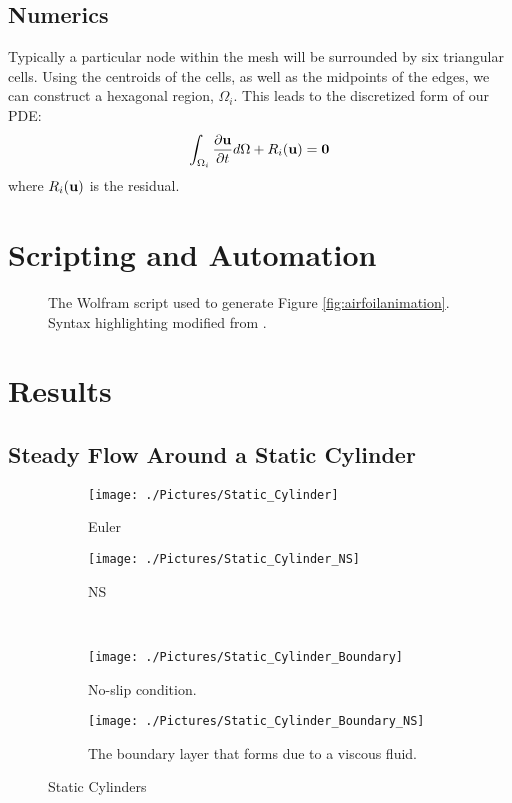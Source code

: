 \documentclass[10pt, titlepage]{article}
\begin{document}
\subsection{Numerics}

Typically a particular node within the mesh will be surrounded by six triangular cells. Using the centroids of the cells, as well as the midpoints of the edges, we can construct a hexagonal region, $\Omega_i$. This leads to the discretized form of our PDE:
\begin{equation*}
\int_{\Omega_i} \frac{\partial \bf{u}}{\partial t} d\Omega + R_i(\bf{u}) = 0
\end{equation*}
where $R_i(\bf{u})$ is the residual.

\section{Scripting and Automation}
\lipsum[1-2]

\begin{figure}[p]

\caption[Automated Wolfram Script]{The Wolfram script used to generate Figure \ref{fig:airfoilanimation}. Syntax highlighting modified from \cite{syntax}.}
\label{script}
\end{figure}

\section{Results}
\lipsum[1-2]

\subsection{Steady Flow Around a Static Cylinder}
\lipsum[1-2]

\begin{figure}[htbp]
\begin{subfigure}{0.5\linewidth}
  \centering
  \texttt{[image: ./Pictures/Static\_Cylinder]}
  \caption{Euler}
  \label{fig:staticeuler}
\end{subfigure}
\begin{subfigure}{0.5\linewidth}
  \centering
  \texttt{[image: ./Pictures/Static\_Cylinder\_NS]}
  \caption{NS}
  \label{fig:staticNS}
\end{subfigure} \\
\begin{subfigure}{0.5\linewidth}
 \centering
 \texttt{[image: ./Pictures/Static\_Cylinder\_Boundary]}
 \caption{No-slip condition.}
 \label{fig:eulerboundary}
\end{subfigure}
\begin{subfigure}{0.5\linewidth}
 \centering
 \texttt{[image: ./Pictures/Static\_Cylinder\_Boundary\_NS]}
 \caption{The boundary layer that forms due to a viscous fluid.}
 \label{fig:nsboundary}
\end{subfigure}
\caption[Static Cylinder]{Static Cylinders}
\label{fig:static}
\end{figure}
\end{document}
